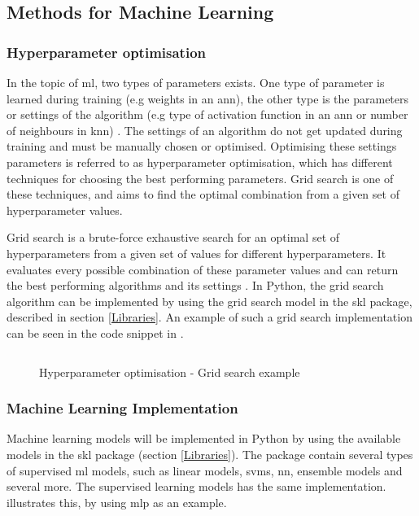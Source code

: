 \documentclass[english, a4paper]{report}
\begin{document}
{{        \subsection{Methods for Machine Learning}
        {
            \subsubsection{Hyperparameter optimisation}\label{HyperparameterOptimisation}
            {
                In the topic of \gls{ml}, two types of parameters exists. One type of parameter is learned during training (e.g weights in an \gls{ann}), the other type is the parameters or settings of the algorithm (e.g type of activation function in an \gls{ann} or number of neighbours in \gls{knn}) \cite{pythonML}. The settings of an algorithm do not get updated during training and must be manually chosen or optimised. Optimising these settings parameters is referred to as hyperparameter optimisation, which has different techniques for choosing the best performing parameters. Grid search is one of these techniques, and aims to find the optimal combination from a given set of hyperparameter values.
                \par
                Grid search is a brute-force exhaustive search for an optimal set of hyperparameters from a given set of values for different hyperparameters. It evaluates every possible combination of these parameter values and can return the best performing algorithms and its settings \cite{pythonML}. 
                In Python, the grid search algorithm can be implemented by using the grid search model in the \gls{skl} package, described in section \ref{Libraries}. An example of such a grid search implementation can be seen in the code snippet in .
            
                \begin{figure}[H]
                    \centering                    {} \inputminted{python}{thesis/Code/GridSearch.py}
                    \caption{Hyperparameter optimisation - Grid search example}
                    \label{fig:gridSearchExample}
                \end{figure}
            }
            
            \subsubsection{Machine Learning Implementation} \label{mlImpl}
            {
                Machine learning models will be implemented in Python by using the available models in the \gls{skl} package (section \ref{Libraries}). The package contain several types of supervised \gls{ml} models, such as linear models, \gls{svm}s, \gls{nn}, ensemble models and several more. The supervised learning models has the same implementation.  illustrates this, by using \gls{mlp} as an example.
                
}}}}
\end{document}
